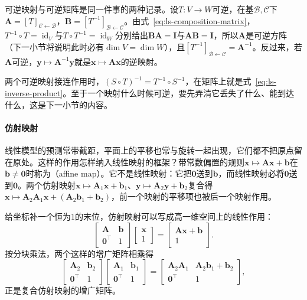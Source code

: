 可逆映射与可逆矩阵是同一件事的两种记录。设$T:V\to W$可逆，在基$\mathcal B,\mathcal C$下$\bm A=[T]_{\mathcal C\leftarrow\mathcal B}$，$\bm B=[T^{-1}]_{\mathcal B\leftarrow\mathcal C}$。由式~\eqref{eq:ls-composition-matrix}，$T^{-1}\circ T=\operatorname{id}_V$与$T\circ T^{-1}=\operatorname{id}_W$分别给出$\bm B\bm A=\bm I$与$\bm A\bm B=\bm I$，所以$\bm A$是可逆方阵（下一小节将说明此时必有$\dim V=\dim W$），且$[T^{-1}]_{\mathcal B\leftarrow\mathcal C}=\bm A^{-1}$。反过来，若$\bm A$可逆，$\bm y\mapsto\bm A^{-1}\bm y$就是$\bm x\mapsto\bm A\bm x$的逆映射。

两个可逆映射接连作用时，$(S\circ T)^{-1}=T^{-1}\circ S^{-1}$，在矩阵上就是式~\eqref{eq:ls-inverse-product}。至于一个映射什么时候可逆，要先弄清它丢失了什么、能到达什么，这是下一小节的内容。

\paragraph{仿射映射}
\label{sec:ls-affine-maps}
线性模型的预测常带截距，平面上的平移也常与旋转一起出现，它们都不把原点留在原处。这样的作用怎样纳入线性映射的框架？带常数偏置的规则$\bm x\mapsto\bm A\bm x+\bm b$在$\bm b\neq\bm0$时称为（affine map）。它不是线性映射：它把$\bm0$送到$\bm b$，而线性映射必将$\bm0$送到$\bm0$。两个仿射映射$\bm x\mapsto\bm A_1\bm x+\bm b_1$、$\bm y\mapsto\bm A_2\bm y+\bm b_2$复合得$\bm x\mapsto\bm A_2\bm A_1\bm x+(\bm A_2\bm b_1+\bm b_2)$，前一个映射的平移项也被后一个映射作用。

给坐标补一个恒为$1$的末位，仿射映射可以写成高一维空间上的线性作用：
\begin{equation}
 \begin{bmatrix}\bm A&\bm b\\ \bm0^\top&1\end{bmatrix}
 \begin{bmatrix}\bm x\\1\end{bmatrix}
 =
 \begin{bmatrix}\bm A\bm x+\bm b\\1\end{bmatrix}.
 \label{eq:ls-affine-homogeneous}
\end{equation}
按分块乘法，两个这样的增广矩阵相乘得
\[
 \begin{bmatrix}\bm A_2&\bm b_2\\ \bm0^\top&1\end{bmatrix}
 \begin{bmatrix}\bm A_1&\bm b_1\\ \bm0^\top&1\end{bmatrix}
 =\begin{bmatrix}\bm A_2\bm A_1&\bm A_2\bm b_1+\bm b_2\\ \bm0^\top&1\end{bmatrix},
\]
正是复合仿射映射的增广矩阵。

